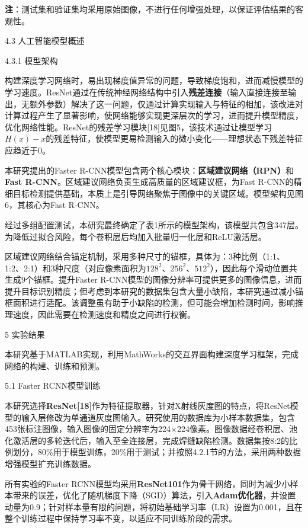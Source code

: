 \textbf{注}：测试集和验证集均采用原始图像，不进行任何增强处理，以保证评估结果的客观性。

4.3 人工智能模型概述

4.3.1 模型架构

构建深度学习网络时，易出现梯度值异常的问题，导致梯度饱和，进而减慢模型的学习速度。ResNet通过在传统神经网络结构中引入\textbf{残差连接}（输入直接连接至输出，无额外参数）解决了这一问题，仅通过计算实现输入与特征的相加，该改进对计算过程产生了显著影响，使网络能够实现更深层次的学习，进而提升模型精度，优化网络性能。ResNet的残差学习模块{[}18{]}见图5，该技术通过让模型学习\(H(x)-x\)的残差特征，使模型更易检测输入的微小变化------理想状态下残差特征应趋近于0。

本研究提出的Faster
R-CNN模型包含两个核心模块：\textbf{区域建议网络（RPN）}和\textbf{Fast
	R-CNN}。区域建议网络负责生成高质量的区域建议框，为Fast
R-CNN的精细目标检测提供基础，本质上是引导网络聚焦于图像中的关键区域。模型架构见图6，其核心为Fast
R-CNN。

经过多组配置测试，本研究最终确定了表1所示的模型架构，该模型共包含347层。为降低过拟合风险，每个卷积层后均加入批量归一化层和ReLU激活层。

区域建议网络结合锚定机制，采用多种尺寸的锚框，具体为：3种比例（1:1、1:2、2:1）和3种尺度（对应像素面积为\(128^2\)、\(256^2\)、\(512^2\)），因此每个滑动位置共生成9个锚框。提升Faster
R-CNN模型的图像分辨率可提供更多的图像信息，进而提升目标识别精度；但考虑到本研究的数据集包含大量小缺陷，本研究通过减小锚框面积进行适配。该调整虽有助于小缺陷的检测，但可能会增加检测时间，影响推理速度，因此需要在检测速度和精度之间进行权衡。

5 实验结果

本研究基于MATLAB实现，利用MathWorks的交互界面构建深度学习框架，完成网络的构建、训练和预测。

5.1 Faster RCNN模型训练

本研究选择\textbf{ResNet{[}18{]}}作为特征提取器，针对X射线灰度图的特点，将ResNet模型的输入层修改为单通道灰度图输入。研究使用的数据库为小样本数据集，包含453张标注图像，输入图像的固定分辨率为224×224像素。图像数据经卷积层、池化激活层的多轮迭代后，输入至全连接层，完成焊缝缺陷检测。数据集按8:2的比例划分，80\%用于模型训练，20\%用于测试；并按照4.2.1节的方法，采用两种数据增强模型扩充训练数据。

所有实验的Faster
RCNN模型均采用\textbf{ResNet101}作为骨干网络，同时为减少小样本带来的误差，优化了随机梯度下降（SGD）算法，引入\textbf{Adam优化器}，并设置动量为0.9；针对样本量有限的问题，将初始基础学习率（LR）设置为0.001，且在整个训练过程中保持学习率不变，以适应不同训练阶段的需求。

